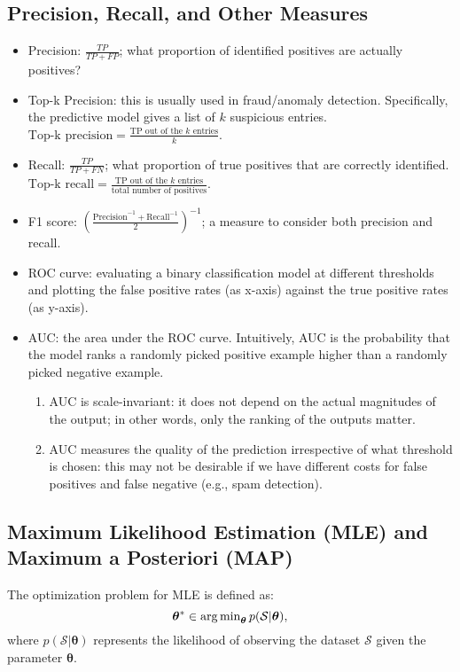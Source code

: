 \subsection{Precision, Recall, and Other Measures}
    \begin{itemize}
        \item Precision: $\frac{TP}{TP + FP}$; what proportion of identified positives are actually positives?
        \item Top-k Precision: this is usually used in fraud/anomaly detection. Specifically, the predictive model gives a list of $k$ suspicious entries.
        $\text{Top-k precision} = \frac{\text{TP out of the $k$ entries}}{k}$.
        \item Recall: $\frac{TP}{TP + FN}$; what proportion of true positives that are correctly identified. $\text{Top-k recall} = \frac{\text{TP out of the $k$ entries}}{\text{total number of positives}}$.
        \item F1 score: $\left( \frac{\text{Precision}^{-1} + \text{Recall}^{-1}}{2} \right)^{-1}$; a measure to consider both precision and recall.
        \item ROC curve: evaluating a binary classification model at different thresholds and plotting the false positive rates (as x-axis) against the true positive rates (as y-axis).
        \item AUC: the area under the ROC curve. Intuitively, AUC is the probability that the model ranks a randomly picked positive example higher than a randomly picked negative example.
            \begin{enumerate}
                \item AUC is scale-invariant: it does not depend on the actual magnitudes of the output; in other words, only the ranking of the outputs matter.
                \item AUC measures the quality of the prediction irrespective of what threshold is chosen: this may not be desirable if we have different costs for false positives and false negative (e.g., spam detection).
            \end{enumerate}
    \end{itemize}
    


\subsection{Maximum Likelihood Estimation (MLE) and Maximum a Posteriori (MAP)}
The optimization problem for MLE is defined as:
\[
\bm{\theta}^\ast \in \operatorname{arg\,min}_{\bm{\theta}} p(\mathcal{S} | \bm{\theta}),
\]
where $p(\mathcal{S}| \bm{\theta})$ represents the likelihood of observing the dataset $\mathcal{S}$ given the parameter $\bm{\theta}$.


